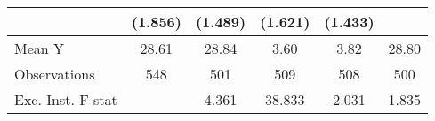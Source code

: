{\begin{tabular}{l*{5}{c}}
            &     (1.856)         &     (1.489)         &     (1.621)         &     (1.433)         &                     \\
\midrule
Mean Y      &       28.61         &       28.84         &        3.60         &        3.82         &       28.80         \\
Observations&         548         &         501         &         509         &         508         &         500         \\
Exc. Inst. F-stat&                     &       4.361         &      38.833         &       2.031         &       1.835         \\
\bottomrule
\end{tabular}
}
